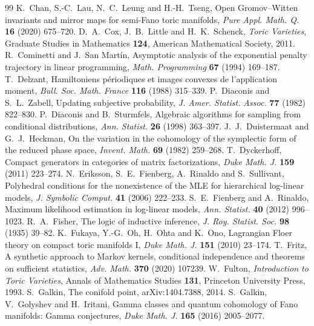 \documentclass[11pt]{article}
\theoremstyle{definition}\newtheorem{definition}[theorem]{Definition}\newtheorem{remark}[theorem]{Remark}\newtheorem{example}[theorem]{Example}\newtheorem{problem}[theorem]{Open problem}\crefname{problem}{Problem}{Problems}
\begin{document}
\begin{thebibliography}{99}
 K.~Chan, S.-C.~Lau, N.~C.~Leung and H.-H.~Tseng, Open Gromov--Witten invariants and mirror maps for semi-Fano toric manifolds, \emph{Pure Appl. Math. Q.} \textbf{16} (2020) 675--720.
 D.~A.~Cox, J.~B.~Little and H.~K.~Schenck, \emph{Toric Varieties}, Graduate Studies in Mathematics \textbf{124}, American Mathematical Society, 2011.
 R.~Cominetti and J.~San Mart\'in, Asymptotic analysis of the exponential penalty trajectory in linear programming, \emph{Math. Programming} \textbf{67} (1994) 169--187.
 T.~Delzant, Hamiltoniens p\'eriodiques et images convexes de l'application moment, \emph{Bull. Soc. Math. France} \textbf{116} (1988) 315--339.
 P.~Diaconis and S.~L.~Zabell, Updating subjective probability, \emph{J. Amer. Statist. Assoc.} \textbf{77} (1982) 822--830.
 P.~Diaconis and B.~Sturmfels, Algebraic algorithms for sampling from conditional distributions, \emph{Ann. Statist.} \textbf{26} (1998) 363--397.
 J.~J.~Duistermaat and G.~J.~Heckman, On the variation in the cohomology of the symplectic form of the reduced phase space, \emph{Invent. Math.} \textbf{69} (1982) 259--268.
 T.~Dyckerhoff, Compact generators in categories of matrix factorizations, \emph{Duke Math. J.} \textbf{159} (2011) 223--274.
 N.~Eriksson, S.~E.~Fienberg, A.~Rinaldo and S.~Sullivant, Polyhedral conditions for the nonexistence of the MLE for hierarchical log-linear models, \emph{J. Symbolic Comput.} \textbf{41} (2006) 222--233.
 S.~E.~Fienberg and A.~Rinaldo, Maximum likelihood estimation in log-linear models, \emph{Ann. Statist.} \textbf{40} (2012) 996--1023.
 R.~A.~Fisher, The logic of inductive inference, \emph{J. Roy. Statist. Soc.} \textbf{98} (1935) 39--82.
 K.~Fukaya, Y.-G.~Oh, H.~Ohta and K.~Ono, Lagrangian Floer theory on compact toric manifolds I, \emph{Duke Math. J.} \textbf{151} (2010) 23--174.
 T.~Fritz, A synthetic approach to Markov kernels, conditional independence and theorems on sufficient statistics, \emph{Adv. Math.} \textbf{370} (2020) 107239.
 W.~Fulton, \emph{Introduction to Toric Varieties}, Annals of Mathematics Studies \textbf{131}, Princeton University Press, 1993.
 S.~Galkin, The conifold point, arXiv:1404.7388, 2014.
 S.~Galkin, V.~Golyshev and H.~Iritani, Gamma classes and quantum cohomology of Fano manifolds: Gamma conjectures, \emph{Duke Math. J.} \textbf{165} (2016) 2005--2077.

\end{thebibliography}
\end{document}
